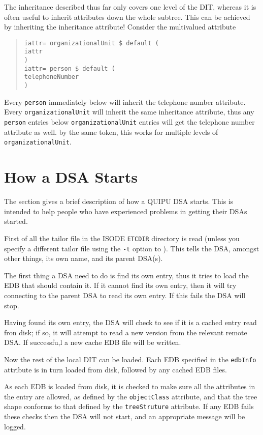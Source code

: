 The inheritance described thus far only covers one level of the
DIT, whereas it is often useful to inherit attributes down the
whole subtree.  This can be achieved by inheriting the inheritance
attribute!
Consider the multivalued attribute
\begin{quote}\begin{verbatim}
iattr= organizationalUnit $ default (
iattr
) 
iattr= person $ default (
telephoneNumber
)
\end{verbatim}\end{quote}
Every \verb+person+ immediately below will inherit the telephone
number attribute.
Every \verb+organizationalUnit+ will inherit the same inheritance
attribute, thus any \verb+person+ entries below \verb+organizationalUnit+
entries will get the telephone number attribute as well.
by the same token, this works for multiple levels of
\verb+organizationalUnit+.


\section {How a DSA Starts}
\label{dsa:starting}

The section gives a brief description of how a QUIPU DSA starts.
This is intended to help people who have experienced problems in getting
their DSAs started.

First of all the tailor file  in the ISODE \verb"ETCDIR" directory
is read (unless you
specify a different tailor file using the \verb"-t" option to
).
This tells the DSA, amongst other things, its own name, and its parent
DSA(s).

The first thing a DSA need to do is find its own entry, thus it tries to
load the EDB that should contain it.
If it cannot find its own entry, then it will try connecting to the
parent DSA to read its own entry. If this fails the DSA will stop.

Having found its own entry, the DSA will check to see if it is a cached
entry read fron disk; if so, it will attempt to read a new version from the
relevant remote DSA. If successfu,l a new cache EDB file will be written.

Now the rest of the local DIT can be loaded.  Each EDB specified in the
\verb+edbInfo+ attribute  is in turn loaded
from disk, followed by any cached EDB files.

As each EDB is loaded from disk, it is checked to make sure all the
attributes in the entry are allowed, as defined by the \verb+objectClass+
attribute,  and that the tree shape conforms to that defined by the
\verb+treeStruture+ attribute. 
If any EDB fails these checks then the DSA will not start, and an appropriate
message will be logged.

